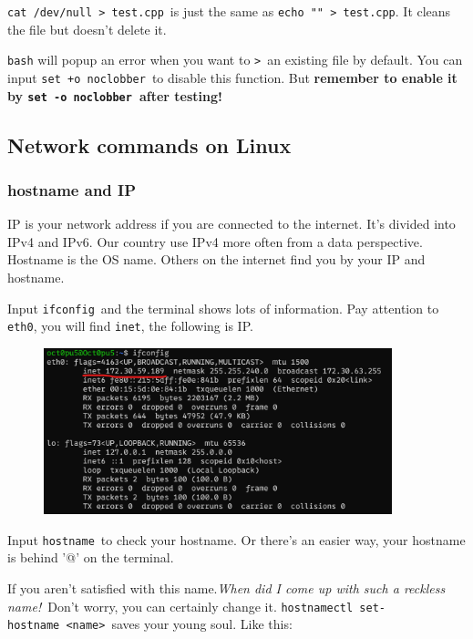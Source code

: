 \documentclass[12pt]{ctexart}
\newenvironment{mdquote}
{%
  \par\noindent
  \begin{list}{}{%
      \setlength{\leftmargin}{1em}%
      \setlength{\rightmargin}{0pt}%
      \setlength{\itemindent}{0pt}%
      \setlength{\listparindent}{\parindent}%
      \setlength{\topsep}{0.5\baselineskip}%
  }
  \item[\textbf{>}\ ]\itshape
}
{\end{list}\par}
\begin{document}
\texttt{cat /dev/null > test.cpp}\ is just the same as \texttt{echo "" > test.cpp}.
It cleans the file but doesn't delete it.

\begin{mdquote}
\texttt{bash} will popup an error when you want to \texttt{>}\ an existing file by default.
You can input \texttt{set\ +o\ noclobber}\ to disable this function. But \textbf{remember to enable
it by \texttt{set\ -o\ noclobber}\ after testing!}
\end{mdquote}

\subsection{\textbf{Network commands on Linux}}

\subsubsection{\textbf{hostname and IP}}

IP is your network address if you are connected to the internet.
It's divided into IPv4 and IPv6. Our country use IPv4
more often from a data perspective. Hostname is the OS name. Others on
the internet find you by your IP and hostname.

Input \texttt{ifconfig}\ and the terminal shows lots of information. Pay
attention to \texttt{eth0}, you will find \texttt{inet}, the following
is IP.

\begin{figure}[H]
    \centering
    \includegraphics[width=0.9\textwidth,keepaspectratio]{assets/Linux/1.9 Linux network commands/1.png}
\end{figure}

Input \texttt{hostname}\ to check your hostname. Or
there's an easier way, your hostname is behind '@' on
the terminal.

If you aren't satisfied with this name.\emph{When did I
come up with such a reckless name!}\ Don't worry, you can
certainly change it.
\texttt{hostnamectl\ set-hostname\ \textless{}name\textgreater{}}\ saves
your young soul. Like this:
\end{document}
